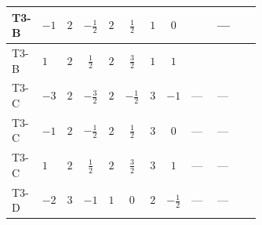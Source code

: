 \documentclass[8pt]{article}
\begin{document}
\begin{landscape}
\begin{longtable}{@{}llcccccc >{\raggedright\arraybackslash}p{0.21\linewidth} >{\raggedright\arraybackslash}p{0.21\linewidth} >{\raggedright\arraybackslash}p{0.21\linewidth}@{}}
\midrule
T3-B & $-1$ & $2$ & $-\frac{1}{2}$ & $2$ & $\frac{1}{2}$ & $1$ & $0$ & \scriptsize\adjustbox{max width=\linewidth}{$\begin{gathered} +T_{\nu}^{(2)} \left({y_2}\right)_{ij}\end{gathered}$} & --- & \scriptsize\adjustbox{max width=\linewidth}{$\begin{gathered} -\frac{9}{4} {g_2}^2 \left({y_2}\right)_{ij}\end{gathered}$} \\
\midrule
T3-B & $1$ & $2$ & $\frac{1}{2}$ & $2$ & $\frac{3}{2}$ & $1$ & $1$ & \scriptsize\adjustbox{max width=\linewidth}{$\begin{gathered} T_{\nu}^{(2)} \left({y_2}\right)_{ij}\end{gathered}$} & \scriptsize\adjustbox{max width=\linewidth}{$\begin{gathered} +\frac{1}{2} (\left({y_1}\,\left({y_1}\right)^{\dagger}\,{y_2}\right)_{ij}+\left({Y_e}\,\left({Y_e}\right)^{\dagger}\,{y_2}\right)_{ij}+3 \left({y_2}\,\left({y_2}\right)^{\dagger}\,{y_2}\right)_{ij})\end{gathered}$} & \scriptsize\adjustbox{max width=\linewidth}{$\begin{gathered} -\frac{9}{4} {g_2}^2 \left({y_2}\right)_{ij}\end{gathered}$} \\
\midrule
T3-C & $-3$ & $2$ & $-\frac{3}{2}$ & $2$ & $-\frac{1}{2}$ & $3$ & $-1$ & --- & --- & \scriptsize\adjustbox{max width=\linewidth}{$\begin{gathered} -\frac{33}{4} {g_2}^2 \left({y_2}\right)_{ij}\end{gathered}$} \\
\midrule
T3-C & $-1$ & $2$ & $-\frac{1}{2}$ & $2$ & $\frac{1}{2}$ & $3$ & $0$ & --- & --- & \scriptsize\adjustbox{max width=\linewidth}{$\begin{gathered} -\frac{33}{4} {g_2}^2 \left({y_2}\right)_{ij}\end{gathered}$} \\
\midrule
T3-C & $1$ & $2$ & $\frac{1}{2}$ & $2$ & $\frac{3}{2}$ & $3$ & $1$ & --- & --- & \scriptsize\adjustbox{max width=\linewidth}{$\begin{gathered} -\frac{33}{4} {g_2}^2 \left({y_2}\right)_{ij}\end{gathered}$} \\
\midrule
T3-D & $-2$ & $3$ & $-1$ & $1$ & $0$ & $2$ & $-\frac{1}{2}$ & --- & --- & \scriptsize\adjustbox{max width=\linewidth}{$\begin{gathered} -\frac{9}{2} {g_2}^2 \left({y_2}\right)_{ij}\end{gathered}$} \\

\end{longtable}
\end{landscape}
\end{document}
